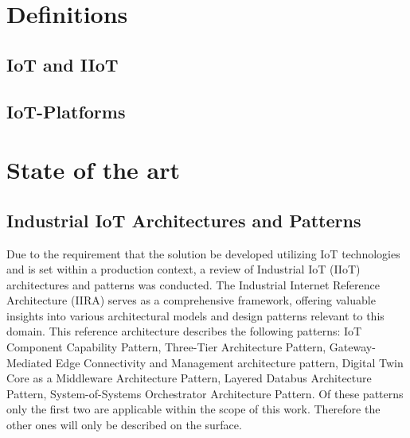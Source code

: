 \section{Definitions}
\subsection{IoT and IIoT}
\subsection{IoT-Platforms}
\section{State of the art}
\subsection{Industrial IoT Architectures and Patterns}
Due to the requirement that the solution be developed utilizing IoT technologies and is set within a production context, a review of Industrial IoT (IIoT) architectures and patterns was conducted. The Industrial Internet Reference Architecture (IIRA) \cite{IIRA} serves as a comprehensive framework, offering valuable insights into various architectural models and design patterns relevant to this domain. This reference architecture describes the following patterns: IoT Component Capability Pattern, Three-Tier Architecture Pattern, Gateway-Mediated Edge Connectivity and Management architecture pattern, Digital Twin Core as a Middleware Architecture Pattern, Layered Databus Architecture Pattern, System-of-Systems Orchestrator Architecture Pattern. Of these patterns only the first two are applicable within the scope of this work. Therefore the other ones will only be described on the surface.
